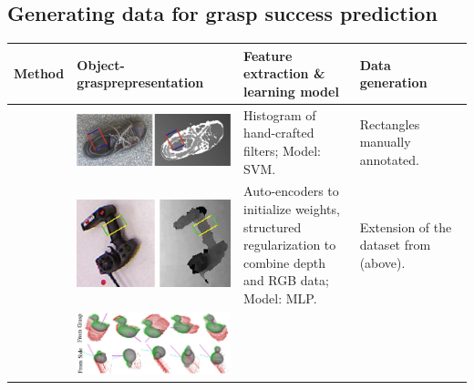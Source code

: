 \documentclass[runningheads]{../llncs}
\begin{document}
\subsection*{Generating data for grasp success prediction}
\begin{table}[h!]
    \scriptsize
    \def\arraystretch{1.2}
    \begin{tabularx}{\linewidth}{L{0.05\linewidth}C{0.39\linewidth}L{0.28\linewidth}L{0.28\linewidth}}
        Method & Object-grasp\linebreak representation & Feature extraction \& learning model & Data generation \\
        \toprule
        \cite{jiang2011}    & \includegraphics[scale=0.09,valign=t]{jiang_et_al-2011-grasp_representation}
        & Histogram of hand-crafted filters; \linebreak Model: SVM.
        & Rectangles manually \linebreak annotated. \\
        \cite{lenz2015}     & \includegraphics[scale=0.16,valign=t]{lenz_et_al-2015-grasp_representation}
        & Auto-encoders to initialize weights, structured regularization to combine depth
        and RGB data; \linebreak Model: MLP.
        & Extension of the \linebreak dataset from \cite{jiang2011} \linebreak (above).\\
        \cite{Kappler2015}  &
        \includegraphics[scale=0.16,valign=t]{kappler_et_al-2015-fig8-local_shape_diff_viewpoints}

\end{tabularx}
\end{table}
\end{document}
